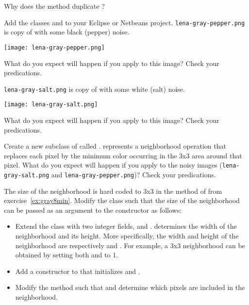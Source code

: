 \documentclass{book}
\begin{document}
\begin{exercise}
Why does the method  duplicate ?
\end{exercise}

\begin{exercise}\label{ex:gray8max}
Add the classes  and  to your Eclipse or Netbeans project. \texttt{lena-gray-pepper.png} is copy of  with some black (pepper) noise.
\begin{center}
\texttt{[image: lena-gray-pepper.png]}
\end{center}
What do you expect will happen if you apply  to this image? Check your predications. 

\texttt{lena-gray-salt.png} is copy of  with some white (salt) noise. 
\begin{center}
\texttt{[image: lena-gray-salt.png]}
\end{center}
What do you expect will happen if you apply  to this image? Check your predications. 
\end{exercise}

\begin{exercise}\label{ex:gray8min}
Create a new subclass of  called .  represents a neighborhood operation that replaces each pixel by the minimum color occurring in the 3x3 area around that pixel. What do you expect will happen if you apply  to the noisy images (\texttt{lena-gray-salt.png} and \texttt{lena-gray-pepper.png})? Check your predications. 
\end{exercise}

\begin{exercise}
The size of the neighborhood is hard coded to 3x3 in the method  of  from exercise~\ref{ex:gray8min}. Modify the class  such that the size of the neighborhood can be passed as an argument to the constructor as follows:
\begin{itemize}
  \item Extend the class  with two integer fields,  and .  determines the width of the neighborhood and  its height. More specifically, the width and height of the neighborhood are respectively  and . For example, a 3x3 neighborhood can be obtained by setting both  and  to 1. %
  \item Add a constructor to  that initializes  and . 
  \item Modify the method  such that  and  determine which pixels are included in the neighborhood. 
\end{itemize}
\end{exercise}
\end{document}
